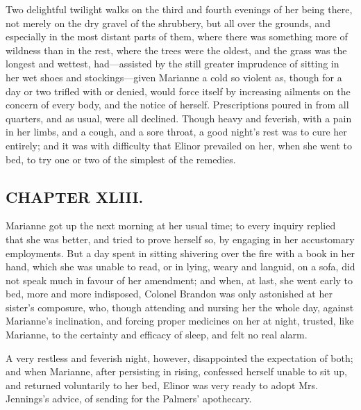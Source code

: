 Two delightful twilight walks on the third and fourth evenings of her being there, not merely on the dry gravel of the shrubbery, but all over the grounds, and especially in the most distant parts of them, where there was something more of wildness than in the rest, where the trees were the oldest, and the grass was the longest and wettest, had---assisted by the still greater imprudence of sitting in her wet shoes and stockings---given Marianne a cold so violent as, though for a day or two trifled with or denied, would force itself by increasing ailments on the concern of every body, and the notice of herself. Prescriptions poured in from all quarters, and as usual, were all declined. Though heavy and feverish, with a pain in her limbs, and a cough, and a sore throat, a good night's rest was to cure her entirely; and it was with difficulty that Elinor prevailed on her, when she went to bed, to try one or two of the simplest of the remedies.

\subsection[chapter-xliii.]{\useURL[url43][][][]\from[url43]CHAPTER XLIII.}

Marianne got up the next morning at her usual time; to every inquiry replied that she was better, and tried to prove herself so, by engaging in her accustomary employments. But a day spent in sitting shivering over the fire with a book in her hand, which she was unable to read, or in lying, weary and languid, on a sofa, did not speak much in favour of her amendment; and when, at last, she went early to bed, more and more indisposed, Colonel Brandon was only astonished at her sister's composure, who, though attending and nursing her the whole day, against Marianne's inclination, and forcing proper medicines on her at night, trusted, like Marianne, to the certainty and efficacy of sleep, and felt no real alarm.

A very restless and feverish night, however, disappointed the expectation of both; and when Marianne, after persisting in rising, confessed herself unable to sit up, and returned voluntarily to her bed, Elinor was very ready to adopt Mrs. Jennings's advice, of sending for the Palmers' apothecary.

